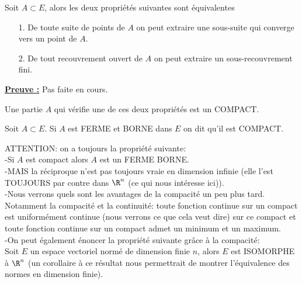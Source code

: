 \documentclass[class=report,crop=false]{standalone}
\begin{document}
 
 
 \begin{proposition}
\textcolor[rgb]{0.50,0.00,0.25}{
Soit $A \subset E$, alors les deux propriétés suivantes sont équivalentes
\begin{itemize}
\item[1.]De toute suite de points de $A$ on peut extraire une sous-suite qui converge vers un point de $A$.
\item[2.]De tout recouvrement ouvert de $A$ on peut extraire un sous-recouvrement fini.
\end{itemize}
}
\end{proposition}

\noindent \underline{\bf Preuve :}
Pas faite en cours.


  
 
\begin{definition}[COMPACT]
\textcolor[rgb]{0.73,0.00,0.00}{
\noindent Une partie $A$ qui vérifie une de ces deux propriétés est un COMPACT.
}
\end{definition}



\begin{definition} 
\textcolor[rgb]{0.73,0.00,0.00}{
\noindent Soit $A \subset E$. Si $A$ est  FERME et BORNE dans $E$ on dit qu'il est COMPACT.
}
\end{definition}

 

\begin{remarque*}\label{extremacompact}
\textcolor[rgb]{0.00,0.00,1.00}{
\noindent ATTENTION: on a toujours la propriété suivante: \\
-Si $A$ est compact alors $A$ est un FERME BORNE.\\
-MAIS la réciproque n'est pas toujours vraie en dimension infinie (elle l'est TOUJOURS par contre
dans $\R^n$ (ce qui nous intéresse ici)).\\
-Nous verrons quels sont les avantages de la compacité un peu plus tard. Notamment la compacité et la 
continuité: toute fonction continue sur un compact est uniformément continue (nous verrons ce que cela 
veut dire) sur ce compact et toute fonction continue sur un compact admet un minimum et un maximum.\\
-On peut également énoncer la propriété suivante grâce à la compacité: \\
Soit $E$ un espace vectoriel normé de dimension finie $n$, alors $E$ est ISOMORPHE à $\R^n$ (un corollaire à ce résultat nous permettrait de montrer l'équivalence des normes en dimension finie).
}
\end{remarque*}
\end{document}
